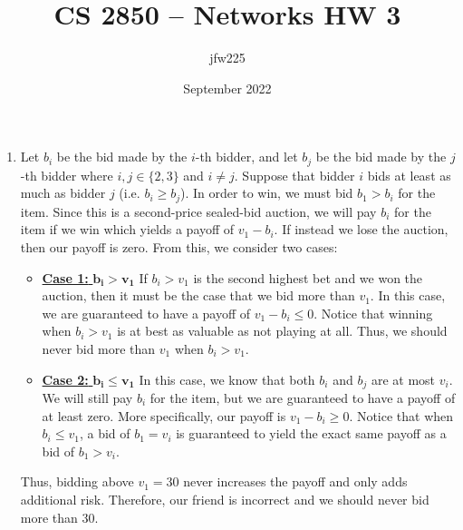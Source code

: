\documentclass{article}
\title{CS 2850 -- Networks HW 3}
\author{jfw225 }
\date{September 2022}
\begin{document}
\maketitle

\begin{enumerate}
    \item Let $b_i$ be the bid made by the $i$-th bidder, and let $b_j$ be the bid made by the $j$-th bidder where $i,j\in\{2,3\}$ and $i\neq j$. Suppose that bidder $i$ bids at least as much as bidder $j$ (i.e. $b_i\geq b_j$). In order to win, we must bid $b_1>b_i$ for the item. Since this is a second-price sealed-bid auction, we will pay $b_i$ for the item if we win which yields a payoff of $v_1-b_i$. If instead we lose the auction, then our payoff is zero. From this, we consider two cases:
    \begin{itemize}
        \item \underline{\textbf{Case 1:} $\mathbf{b_i>v_1}$} If $b_i>v_1$ is the second highest bet and we won the auction, then it must be the case that we bid more than $v_1$. In this case, we are guaranteed to have a payoff of $v_1-b_i\leq0$. Notice that winning when $b_i>v_1$ is at best as valuable as not playing at all. Thus, we should never bid more than $v_1$ when $b_i>v_1$.
        \item \underline{\textbf{Case 2:} $\mathbf{b_i\leq v_1}$} In this case, we know that both $b_i$ and $b_j$ are at most $v_i$. We will still pay $b_i$ for the item, but we are guaranteed to have a payoff of at least zero. More specifically, our payoff is $v_1-b_i\geq0$. Notice that when $b_i\leq v_1$, a bid of $b_1=v_i$ is guaranteed to yield the exact same payoff as a bid of $b_1>v_i$.
    \end{itemize}

    Thus, bidding above $v_1=30$ never increases the payoff and only adds additional risk. Therefore, our friend is incorrect and we should never bid more than 30.


\end{enumerate}
\end{document}
